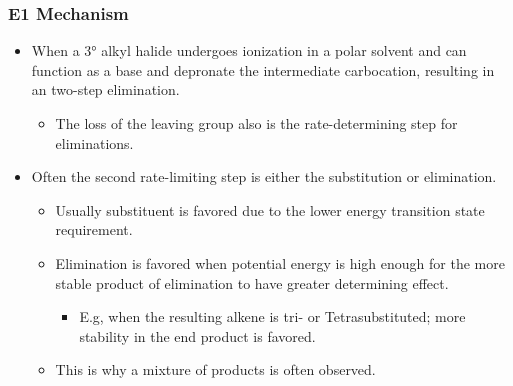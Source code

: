 \documentclass[12pt,a4paper]{article}
\begin{document}
\begin{itemize}
    \subsubsection{E1 Mechanism}
    \begin{itemize}
        \item When a \ang{3} alkyl halide undergoes ionization in a polar solvent and can function as a {\color{o-Sun}base} and depronate the intermediate carbocation, resulting in an two-step elimination.
            \begin{itemize}
                \item The {\color{o-Sun}loss of the leaving group} also is the {\color{o-Sun}rate-determining} step for eliminations.
            \end{itemize}
        \item Often the second rate-limiting step is either the substitution or elimination.
            \begin{itemize}
                \item Usually substituent is favored due to the lower energy transition state requirement.
                \item Elimination is favored when potential energy is high enough for the more stable product of elimination to have greater determining effect.
                    \begin{itemize}
                        \item E.g, when the resulting alkene is tri- or Tetrasubstituted; more stability in the end product is favored.
                    \end{itemize}
                \item This is why a mixture of products is often observed.
            \end{itemize}
    \end{itemize}

\end{itemize}
\end{document}
